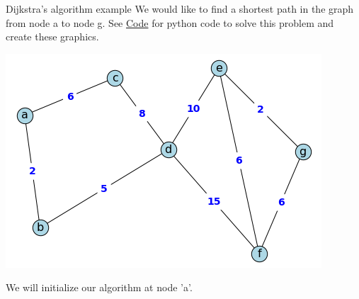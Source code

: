 \begin{example}{Dijkstra's algorithm example}{}
We would like to find a shortest path in the graph from node a to node g.  See \href{https://github.com/open-optimization/open-optimization-or-book/blob/master/instructive-code/networkx%20example%20-%20Dijkstra's%20Algorithm.ipynb}{Code}
for python code to solve this problem and create these graphics.\\
\begin{center}
\includegraphics[scale = 0.5]{graph-theory-graphics/dijkstra0.png}\\
\end{center}
We will initialize our algorithm at node 'a'.  


\end{example}
